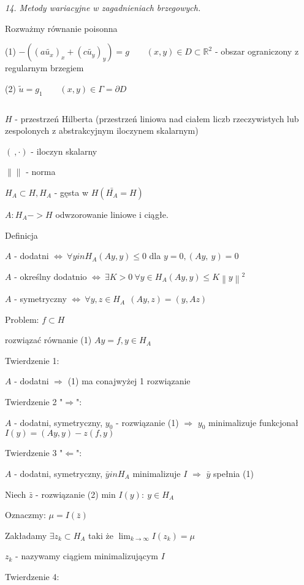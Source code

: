 \textit{14. Metody wariacyjne w zagadnieniach brzegowych.}

Rozważmy równanie poisonna

(1) $-((a\tilde{u_x})_x + (c\tilde{u_y})_y) = g\ \ \ \ \ \ \ \ \ (x,y) \in D \subset \mathbb{R}^2$ - obszar ograniczony z regularnym brzegiem

(2) $\tilde{u} = g_1\ \ \ \ \ \ \ \ \ (x,y) \in \Gamma = \partial D$

$\ $

$H$ - przestrzeń Hilberta (przestrzeń liniowa nad ciałem liczb rzeczywistych lub zespolonych z abstrakcyjnym iloczynem skalarnym)

$(\ ,\cdot)$ - iloczyn skalarny

$\left \|  \right \|$ - norma

$H_A \subset H, H_A$ - gęsta w $H (\bar{H_A} = H)$

$A: H_A -> H$ odwzorowanie liniowe i ciągłe.

Definicja

$A$ - dodatni $\Leftrightarrow\ \forall y in H_A (Ay,y) \leqslant 0$    dla $y = 0, (Ay,\ y) = 0$

$A$ - określny dodatnio $\Leftrightarrow\ \exists K > 0\ \forall y \in H_A (Ay,y) \leqslant K \left \| y \right \| ^ 2$

$A$ - symetryczny $\Leftrightarrow\ \forall y,z \in H_A\ \ (Ay,z) = (y,Az)$

Problem: $f \subset H$

    rozwiązać równanie (1) $Ay=f, y \in H_A$
    
Twierdzenie 1:

$A$ - dodatni $\Rightarrow$ (1) ma conajwyżej 1 rozwiązanie

Twierdzenie 2 "$\Rightarrow$":

$A$ - dodatni, symetryczny, $y_0$ - rozwiązanie (1) $\Rightarrow$ $y_0$ minimalizuje funkcjonał $I(y) = (Ay,y) - z(f,y)$

Twierdzenie 3 "$\Leftarrow$":

$A$ - dodatni, symetryczny, $\bar{y} in H_A$ minimalizuje $I$ $\Rightarrow$ $\bar{y}$ spełnia (1)


Niech $\bar{z}$ - rozwiązanie (2) min ${ I(y):\ y \in H_A}$

Oznaczmy: $\mu = I(\bar{z})$

Zakładamy $\exists {z_k} \subset H_A$ taki że $\lim_{k \to \infty} I(z_k) = \mu$

${z_k}$ - nazywamy ciągiem minimalizującym $I$

Twierdzenie 4:

